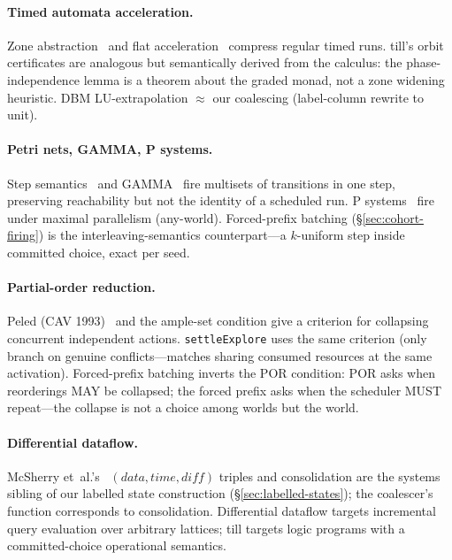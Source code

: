 \documentclass[11pt]{article}
\theoremstyle{remark}
\begin{document}
\paragraph{Timed automata acceleration.}
Zone abstraction~\cite{BengtssonYi04} and flat
acceleration~\cite{BoigelotFAST} compress regular timed runs.  till's orbit
certificates are analogous but semantically derived from the calculus: the
phase-independence lemma is a theorem about the graded monad, not a zone widening
heuristic.  DBM LU-extrapolation $\approx$ our coalescing (label-column rewrite to
unit).

\paragraph{Petri nets, GAMMA, P systems.}
Step semantics~\cite{BestDevillers87} and GAMMA~\cite{BanatreLeMet90} fire
multisets of transitions in one step, preserving reachability but not the identity
of a scheduled run.  P systems~\cite{Paun00} fire under maximal parallelism
(any-world).  Forced-prefix batching (\S\ref{sec:cohort-firing}) is the
interleaving-semantics counterpart---a $k$-uniform step inside committed choice,
exact per seed.

\paragraph{Partial-order reduction.}
Peled (CAV 1993)~\cite{Peled93} and the ample-set condition give a criterion for
collapsing concurrent independent actions.  \texttt{settleExplore} uses the same
criterion (only branch on genuine conflicts---matches sharing consumed resources at
the same activation).  Forced-prefix batching inverts the POR condition: POR asks
when reorderings MAY be collapsed; the forced prefix asks when the scheduler MUST
repeat---the collapse is not a choice among worlds but the world.

\paragraph{Differential dataflow.}
McSherry et~al.'s~\cite{MurrayMcsherry13} $(\mathit{data}, \mathit{time},
\mathit{diff})$ triples and consolidation are the systems sibling of our labelled
state construction (\S\ref{sec:labelled-states}); the coalescer's function
corresponds to consolidation.  Differential dataflow targets incremental query
evaluation over arbitrary lattices; till targets logic programs with a
committed-choice operational semantics.
\end{document}
